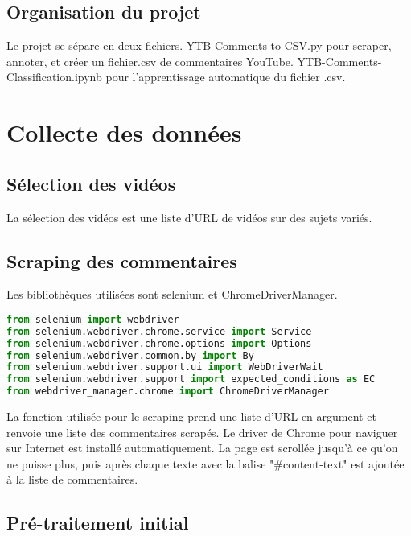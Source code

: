 \documentclass[a4paper, 12pt, openany]{book}
\begin{document}
\section*{Organisation du projet}
Le projet se sépare en deux fichiers. YTB-Comments-to-CSV.py pour scraper, annoter, et créer un fichier.csv de commentaires YouTube. YTB-Comments-Classification.ipynb pour l'apprentissage automatique du fichier .csv.

\chapter*{Collecte des données}
\section*{Sélection des vidéos}

La sélection des vidéos est une liste d'URL de vidéos sur des sujets variés.

\section*{Scraping des commentaires}
Les bibliothèques utilisées sont selenium et ChromeDriverManager.

\begin{lstlisting}[language=Python]
from selenium import webdriver
from selenium.webdriver.chrome.service import Service
from selenium.webdriver.chrome.options import Options
from selenium.webdriver.common.by import By
from selenium.webdriver.support.ui import WebDriverWait
from selenium.webdriver.support import expected_conditions as EC
from webdriver_manager.chrome import ChromeDriverManager
\end{lstlisting}

La fonction utilisée pour le scraping prend une liste d'URL en argument et renvoie une liste des commentaires scrapés. Le driver de Chrome pour naviguer sur Internet est installé automatiquement. La page est scrollée jusqu'à ce qu'on ne puisse plus, puis après chaque texte avec la balise "#content-text" est ajoutée à la liste de commentaires.

\section*{Pré-traitement initial}
\end{document}
